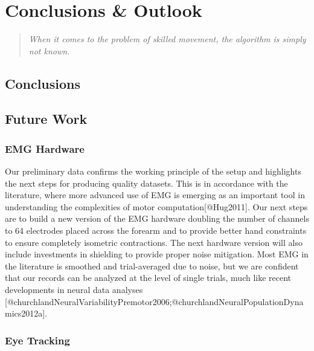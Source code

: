 \documentclass[../main.tex]{subfiles}
\begin{document}
\chapter{Conclusions \& Outlook}\label{chap:conclusions}


\begin{quote}
    \emph{When it comes to the problem of skilled movement, the algorithm is simply not known.}\\ 
\end{quote}


\cleardoublepage%



\section{Conclusions}\label{sec:conclusion}


\section{Future Work}\label{sec:next_steps}


\subsection{EMG Hardware}

Our preliminary data confirms the working principle of the setup and highlights the next steps for producing quality datasets. This is in accordance with the literature, where more advanced use of EMG is emerging as an important tool in understanding the complexities of motor computation[@Hug2011]. Our next steps are to build a new version of the EMG hardware doubling the number of channels to 64 electrodes placed across the forearm and to provide better hand constraints to ensure completely isometric contractions. The next hardware version will also include investments in shielding to provide proper noise mitigation. Most EMG in the literature is smoothed and trial-averaged due to noise, but we are confident that our records can be analyzed at the level of single trials, much like recent developments in neural data analyses [@churchlandNeuralVariabilityPremotor2006;@churchlandNeuralPopulationDynamics2012a].

\subsection{Eye Tracking}
\end{document}
